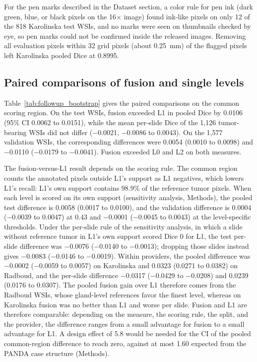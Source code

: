 \documentclass[10pt,letterpaper]{article}
\begin{document}
For the pen marks described in the Dataset section, a color rule for pen ink (dark green, blue, or black pixels on the 16$\times$ image) found ink-like pixels on only 12 of the 818 Karolinska test WSIs, and no marks were seen on thumbnails checked by eye, so pen marks could not be confirmed inside the released images. Removing all evaluation pixels within 32 grid pixels (about 0.25~mm) of the flagged pixels left Karolinska pooled Dice at 0.8995.

\subsection*{Paired comparisons of fusion and single levels}
Table~\ref{tab:followup_bootstrap} gives the paired comparisons on the common scoring region. On the test WSIs, fusion exceeded L1 in pooled Dice by 0.0106 (95\% CI 0.0062 to 0.0151), while the mean per-slide Dice of the 1,126 tumor-bearing WSIs did not differ ($-$0.0021, $-$0.0086 to 0.0043). On the 1,577 validation WSIs, the corresponding differences were 0.0054 (0.0010 to 0.0098) and $-$0.0110 ($-$0.0179 to $-$0.0041). Fusion exceeded L0 and L2 on both measures.

The fusion-versus-L1 result depends on the scoring rule. The common region counts the annotated pixels outside L1's support as L1 negatives, which lowers L1's recall: L1's own support contains 98.9\% of the reference tumor pixels. When each level is scored on its own support (sensitivity analysis, Methods), the pooled test difference is 0.0058 (0.0017 to 0.0100), and the validation difference is 0.0004 ($-$0.0039 to 0.0047) at 0.43 and $-$0.0001 ($-$0.0045 to 0.0043) at the level-specific thresholds. Under the per-slide rule of the sensitivity analysis, in which a slide without reference tumor in L1's own support scored Dice 0 for L1, the test per-slide difference was $-$0.0076 ($-$0.0140 to $-$0.0013); dropping those slides instead gives $-$0.0083 ($-$0.0146 to $-$0.0019). Within providers, the pooled difference was $-$0.0002 ($-$0.0059 to 0.0057) on Karolinska and 0.0323 (0.0271 to 0.0382) on Radboud, and the per-slide difference $-$0.0317 ($-$0.0429 to $-$0.0208) and 0.0239 (0.0176 to 0.0307). The pooled fusion gain over L1 therefore comes from the Radboud WSIs, whose gland-level references favor the finest level, whereas on Karolinska fusion was no better than L1 and worse per slide. Fusion and L1 are therefore comparable: depending on the measure, the scoring rule, the split, and the provider, the difference ranges from a small advantage for fusion to a small advantage for L1. A design effect of 5.8 would be needed for the CI of the pooled common-region difference to reach zero, against at most 1.60 expected from the PANDA case structure (Methods).
\end{document}
